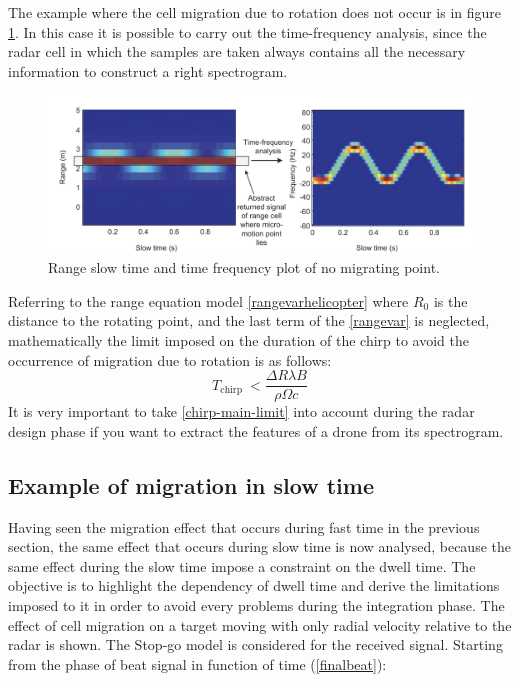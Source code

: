 The example where the cell migration due to rotation does not occur is in figure \ref{spectr-without-migration}. In this case it is possible to carry out the time-frequency analysis, since the radar cell in which the samples are taken always contains all the necessary information to construct a right spectrogram.
\begin{figure}[h!]
    \centering
    \includegraphics[width=16cm]{Time-frequency analysis-chap3/img/spect without migration.png}
    \caption{Range slow time and time frequency plot of no migrating point.\cite{chen_chinese} }
    \label{spectr-without-migration}
\end{figure}


Referring to the range equation model \ref{rangevarhelicopter} where $R_0$ is the distance to the rotating point, and the last term of the \ref{rangevar} is neglected, mathematically the limit imposed on the duration of the chirp to avoid the occurrence of migration due to rotation is as follows:
\begin{equation}
T_{\text {chirp }}<\frac{\Delta R \lambda B}{\rho \Omega c}
\label{chirp-main-limit}
\end{equation}
It is very important to take \ref{chirp-main-limit} into account during the radar design phase if you want to extract the features of a drone from its spectrogram.


\subsection{Example of migration in slow time}
Having seen the migration effect that occurs during fast time in the previous section, the same effect that occurs during slow time is now analysed, because the same effect during the slow time impose a constraint on the dwell time. The objective is to highlight the dependency of dwell time and derive the limitations imposed to it in order to avoid every problems during the integration phase. 
The effect of cell migration on a target moving with only radial velocity relative to the radar is shown. The Stop-go model is considered for the received signal.
Starting from the phase of beat signal in function of time (\ref{finalbeat}): 

